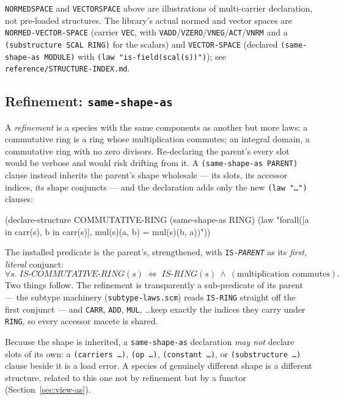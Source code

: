 \begin{remark}
\texttt{NORMEDSPACE} and \texttt{VECTORSPACE} above are illustrations of
multi-carrier declaration, not pre-loaded structures.  The library's actual
normed and vector spaces are \texttt{NORMED-VECTOR-SPACE} (carrier \texttt{VEC},
with \texttt{VADD}/\texttt{VZERO}/\texttt{VNEG}/\texttt{ACT}/\texttt{VNRM} and a
\texttt{(substructure SCAL RING)} for the scalars) and \texttt{VECTOR-SPACE}
(declared \texttt{(same-shape-as MODULE)} with \texttt{(law "is-field(scal(s))")});
see \texttt{reference/STRUCTURE-INDEX.md}.
\end{remark}

\subsection{Refinement: \texttt{same-shape-as}}
\label{sec:same-shape-as}

A \emph{refinement} is a species with the same components as another but more
laws: a commutative ring is a ring whose multiplication commutes; an integral
domain, a commutative ring with no zero divisors.  Re-declaring the parent's
every slot would be verbose and would risk drifting from it.  A
\texttt{(same-shape-as PARENT)} clause instead inherits the parent's shape
wholesale --- its slots, its accessor indices, its shape conjuncts --- and the
declaration adds only the new \texttt{(law "\ldots")} clauses:

\begin{VNBcode}
(declare-structure COMMUTATIVE-RING
  (same-shape-as RING)
  (law "forall([a in carr(s), b in carr(s)], mul(s)(a, b) = mul(s)(b, a))"))
\end{VNBcode}

The installed predicate is the parent's, strengthened, with
\texttt{IS-\textit{PARENT}} as its \emph{first, literal} conjunct:
\[
  \forall s.\;\mathit{IS\text{-}COMMUTATIVE\text{-}RING}(s)
    \;\Leftrightarrow\;
    \mathit{IS\text{-}RING}(s)\ \wedge\ (\text{multiplication commutes}).
\]
Two things follow.  The refinement is transparently a sub-predicate of its
parent --- the subtype machinery (\texttt{subtype-laws.scm}) reads
\texttt{IS-RING} straight off the first conjunct --- and \texttt{CARR},
\texttt{ADD}, \texttt{MUL}, \ldots keep exactly the indices they carry under
\texttt{RING}, so every accessor macete is shared.

Because the shape is inherited, a \texttt{same-shape-as} declaration \emph{may
not} declare slots of its own: a \texttt{(carriers \ldots)}, \texttt{(op
\ldots)}, \texttt{(constant \ldots)}, or \texttt{(substructure \ldots)} clause
beside it is a load error.  A species of genuinely different shape is a
different structure, related to this one not by refinement but by a functor
(Section~\ref{sec:view-as}).

